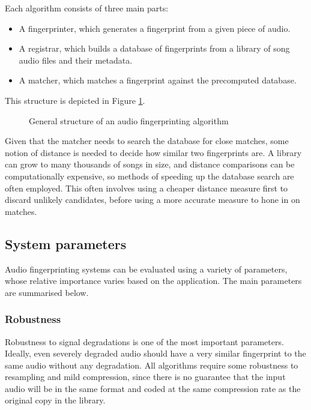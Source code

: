 \documentclass[12pt,a4paper,twoside,openright]{report}
\begin{document}
Each algorithm consists of three main parts: 

\begin{itemize}
  \item A fingerprinter, which generates a fingerprint from a given piece of audio.
  \item A registrar, which builds a database of fingerprints from a library of song audio files and their metadata.
  \item A matcher, which matches a fingerprint against the precomputed database.
\end{itemize}

This structure is depicted in Figure \ref{fig:generalframework}. 

\begin{figure}[ht]
  \centering
  
  \caption{General structure of an audio fingerprinting algorithm}
  \label{fig:generalframework}
\end{figure}

Given that the matcher needs to search the database for close matches, some notion of distance is needed to decide how similar two fingerprints are. A library can grow to many thousands of songs in size, and distance comparisons can be computationally expensive, so methods of speeding up the database search are often employed. This often involves using a cheaper distance measure first to discard unlikely candidates, before using a more accurate measure to hone in on matches.


\subsection{System parameters}
\label{section:systemparams}

Audio fingerprinting systems can be evaluated using a variety of parameters, whose relative importance varies based on the application. 
The main parameters are summarised below.

\subsubsection{Robustness}

Robustness to signal degradations is one of the most important parameters. Ideally, even severely degraded audio should have a very similar fingerprint to the same audio without any degradation. All algorithms require some robustness to resampling and mild compression, since there is no guarantee that the input audio will be in the same format and coded at the same compression rate as the original copy in the library.
\end{document}
